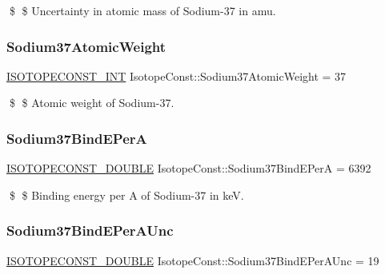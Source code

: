 \$ \$ Uncertainty in atomic mass of Sodium-\/37 in amu. \mbox{\label{group___isotope_const-_sodium-_na37_ga9a2eb9be0772b138d87dd13cd55b600a}} 
\subsubsection{\texorpdfstring{Sodium37\+Atomic\+Weight}{Sodium37AtomicWeight}}
{\footnotesize\ttfamily \mbox{\hyperlink{group___isotope_const-_macros_ga5f18360b3e99483a35c32d789e62621c}{I\+S\+O\+T\+O\+P\+E\+C\+O\+N\+S\+T\+\_\+\+I\+NT}} Isotope\+Const\+::\+Sodium37\+Atomic\+Weight = 37}

\$ \$ Atomic weight of Sodium-\/37. \mbox{\label{group___isotope_const-_sodium-_na37_ga4d66597392b2b7eae6f25c0c4e667016}} 
\subsubsection{\texorpdfstring{Sodium37\+Bind\+E\+PerA}{Sodium37BindEPerA}}
{\footnotesize\ttfamily \mbox{\hyperlink{group___isotope_const-_macros_ga8f45a7272ce02c0b4c65c44636ed719a}{I\+S\+O\+T\+O\+P\+E\+C\+O\+N\+S\+T\+\_\+\+D\+O\+U\+B\+LE}} Isotope\+Const\+::\+Sodium37\+Bind\+E\+PerA = 6392}

\$ \$ Binding energy per A of Sodium-\/37 in keV. \mbox{\label{group___isotope_const-_sodium-_na37_gabb1ebed52eb8917630d2933db0fba69e}} 
\subsubsection{\texorpdfstring{Sodium37\+Bind\+E\+Per\+A\+Unc}{Sodium37BindEPerAUnc}}
{\footnotesize\ttfamily \mbox{\hyperlink{group___isotope_const-_macros_ga8f45a7272ce02c0b4c65c44636ed719a}{I\+S\+O\+T\+O\+P\+E\+C\+O\+N\+S\+T\+\_\+\+D\+O\+U\+B\+LE}} Isotope\+Const\+::\+Sodium37\+Bind\+E\+Per\+A\+Unc = 19}

